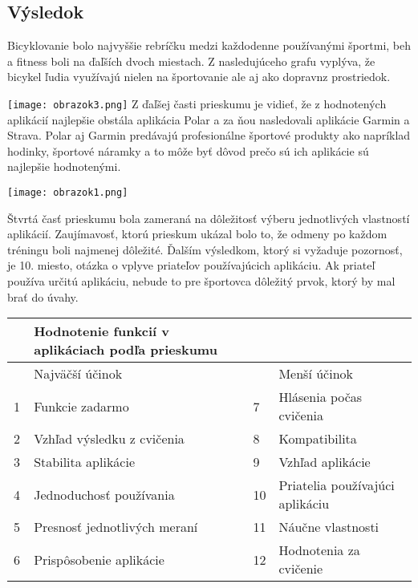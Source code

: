 \documentclass[10pt,twoside,slovak,a4paper]{article}
\begin{document}
\subsection{Výsledok} \label{Výsledok}
Bicyklovanie bolo najvyššie rebríčku medzi každodenne používanými športmi, beh a fitness boli na ďaľších dvoch miestach. Z nasledujúceho grafu vyplýva, že bicykel ľudia využívajú nielen na športovanie ale aj ako dopravnz prostriedok.

\hfill \break
\texttt{[image: obrazok3.png]}
\hfill \break
Z ďaľšej časti prieskumu je vidieť, že z hodnotených aplikácií najlepšie obstála aplikácia Polar a za ňou nasledovali aplikácie Garmin a Strava. Polar aj Garmin predávajú profesionálne športové produkty ako napríklad hodinky, športové náramky a to môže byť dôvod prečo sú ich aplikácie sú najlepšie hodnotenými.

\hfill \break
\texttt{[image: obrazok1.png]}

Štvrtá časť prieskumu bola zameraná na dôležitosť výberu jednotlivých vlastností aplikácií. Zaujímavosť, ktorú prieskum ukázal bolo to, že odmeny po každom tréningu boli najmenej dôležité. Ďalším výsledkom, ktorý si vyžaduje pozornosť, je 10. miesto, otázka o vplyve priateľov používajúcich aplikáciu. Ak priateľ používa určitú aplikáciu, nebude to pre športovca dôležitý prvok, ktorý by mal brať do úvahy.
\hfill \break
\begin{table}[!ht]
    \centering
    \begin{tabular}{|l|l|l|l|}
    \hline
        ~ & Hodnotenie funkcií v aplikáciach podľa prieskumu & ~ & ~ \\ \hline
        ~ & Najväčší účinok & ~ & Menší účinok \\ \hline
        1 & Funkcie zadarmo & 7 & Hlásenia počas cvičenia \\ \hline
        2 & Vzhľad výsledku z cvičenia & 8 & Kompatibilita \\ \hline
        3 & Stabilita aplikácie & 9 & Vzhľad aplikácie \\ \hline
        4 & Jednoduchosť používania & 10 & Priatelia používajúci aplikáciu \\ \hline
        5 & Presnosť jednotlivých meraní & 11 & Náučne vlastnosti \\ \hline
        6 & Prispôsobenie aplikácie & 12 & Hodnotenia za cvičenie \\ \hline
    \end{tabular}
\end{table}
\end{document}
